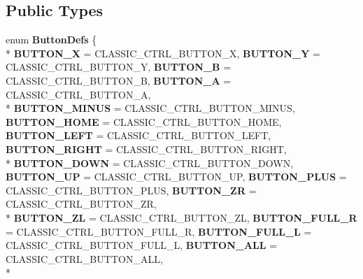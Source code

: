 \subsection*{Public Types}
\begin{DoxyCompactItemize}
\item 
enum {\bfseries Button\-Defs} \{ \\*
{\bfseries B\-U\-T\-T\-O\-N\-\_\-\-X} =  C\-L\-A\-S\-S\-I\-C\-\_\-\-C\-T\-R\-L\-\_\-\-B\-U\-T\-T\-O\-N\-\_\-\-X, 
{\bfseries B\-U\-T\-T\-O\-N\-\_\-\-Y} =  C\-L\-A\-S\-S\-I\-C\-\_\-\-C\-T\-R\-L\-\_\-\-B\-U\-T\-T\-O\-N\-\_\-\-Y, 
{\bfseries B\-U\-T\-T\-O\-N\-\_\-\-B} =  C\-L\-A\-S\-S\-I\-C\-\_\-\-C\-T\-R\-L\-\_\-\-B\-U\-T\-T\-O\-N\-\_\-\-B, 
{\bfseries B\-U\-T\-T\-O\-N\-\_\-\-A} =  C\-L\-A\-S\-S\-I\-C\-\_\-\-C\-T\-R\-L\-\_\-\-B\-U\-T\-T\-O\-N\-\_\-\-A, 
\\*
{\bfseries B\-U\-T\-T\-O\-N\-\_\-\-M\-I\-N\-U\-S} =  C\-L\-A\-S\-S\-I\-C\-\_\-\-C\-T\-R\-L\-\_\-\-B\-U\-T\-T\-O\-N\-\_\-\-M\-I\-N\-U\-S, 
{\bfseries B\-U\-T\-T\-O\-N\-\_\-\-H\-O\-M\-E} =  C\-L\-A\-S\-S\-I\-C\-\_\-\-C\-T\-R\-L\-\_\-\-B\-U\-T\-T\-O\-N\-\_\-\-H\-O\-M\-E, 
{\bfseries B\-U\-T\-T\-O\-N\-\_\-\-L\-E\-F\-T} =  C\-L\-A\-S\-S\-I\-C\-\_\-\-C\-T\-R\-L\-\_\-\-B\-U\-T\-T\-O\-N\-\_\-\-L\-E\-F\-T, 
{\bfseries B\-U\-T\-T\-O\-N\-\_\-\-R\-I\-G\-H\-T} =  C\-L\-A\-S\-S\-I\-C\-\_\-\-C\-T\-R\-L\-\_\-\-B\-U\-T\-T\-O\-N\-\_\-\-R\-I\-G\-H\-T, 
\\*
{\bfseries B\-U\-T\-T\-O\-N\-\_\-\-D\-O\-W\-N} =  C\-L\-A\-S\-S\-I\-C\-\_\-\-C\-T\-R\-L\-\_\-\-B\-U\-T\-T\-O\-N\-\_\-\-D\-O\-W\-N, 
{\bfseries B\-U\-T\-T\-O\-N\-\_\-\-U\-P} =  C\-L\-A\-S\-S\-I\-C\-\_\-\-C\-T\-R\-L\-\_\-\-B\-U\-T\-T\-O\-N\-\_\-\-U\-P, 
{\bfseries B\-U\-T\-T\-O\-N\-\_\-\-P\-L\-U\-S} =  C\-L\-A\-S\-S\-I\-C\-\_\-\-C\-T\-R\-L\-\_\-\-B\-U\-T\-T\-O\-N\-\_\-\-P\-L\-U\-S, 
{\bfseries B\-U\-T\-T\-O\-N\-\_\-\-Z\-R} =  C\-L\-A\-S\-S\-I\-C\-\_\-\-C\-T\-R\-L\-\_\-\-B\-U\-T\-T\-O\-N\-\_\-\-Z\-R, 
\\*
{\bfseries B\-U\-T\-T\-O\-N\-\_\-\-Z\-L} =  C\-L\-A\-S\-S\-I\-C\-\_\-\-C\-T\-R\-L\-\_\-\-B\-U\-T\-T\-O\-N\-\_\-\-Z\-L, 
{\bfseries B\-U\-T\-T\-O\-N\-\_\-\-F\-U\-L\-L\-\_\-\-R} =  C\-L\-A\-S\-S\-I\-C\-\_\-\-C\-T\-R\-L\-\_\-\-B\-U\-T\-T\-O\-N\-\_\-\-F\-U\-L\-L\-\_\-\-R, 
{\bfseries B\-U\-T\-T\-O\-N\-\_\-\-F\-U\-L\-L\-\_\-\-L} =  C\-L\-A\-S\-S\-I\-C\-\_\-\-C\-T\-R\-L\-\_\-\-B\-U\-T\-T\-O\-N\-\_\-\-F\-U\-L\-L\-\_\-\-L, 
{\bfseries B\-U\-T\-T\-O\-N\-\_\-\-A\-L\-L} =  C\-L\-A\-S\-S\-I\-C\-\_\-\-C\-T\-R\-L\-\_\-\-B\-U\-T\-T\-O\-N\-\_\-\-A\-L\-L, 
\\*

\end{DoxyCompactItemize}
